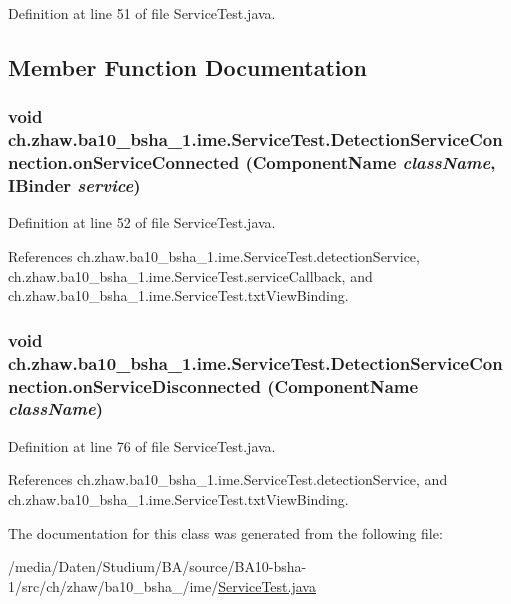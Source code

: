 Definition at line 51 of file ServiceTest.java.

\subsection{Member Function Documentation}
\hypertarget{classch_1_1zhaw_1_1ba10__bsha__1_1_1ime_1_1ServiceTest_1_1DetectionServiceConnection_a52d46455b7ea802c55717fe7b5f51759}{
\subsubsection[{onServiceConnected}]{\setlength{\rightskip}{0pt plus 5cm}void ch.zhaw.ba10\_\-bsha\_\-1.ime.ServiceTest.DetectionServiceConnection.onServiceConnected (ComponentName {\em className}, \/  IBinder {\em service})}}
\label{classch_1_1zhaw_1_1ba10__bsha__1_1_1ime_1_1ServiceTest_1_1DetectionServiceConnection_a52d46455b7ea802c55717fe7b5f51759}


Definition at line 52 of file ServiceTest.java.

References ch.zhaw.ba10\_\-bsha\_\-1.ime.ServiceTest.detectionService, ch.zhaw.ba10\_\-bsha\_\-1.ime.ServiceTest.serviceCallback, and ch.zhaw.ba10\_\-bsha\_\-1.ime.ServiceTest.txtViewBinding.\hypertarget{classch_1_1zhaw_1_1ba10__bsha__1_1_1ime_1_1ServiceTest_1_1DetectionServiceConnection_a308b18246d990cb67a51836ba8ea9f05}{
\subsubsection[{onServiceDisconnected}]{\setlength{\rightskip}{0pt plus 5cm}void ch.zhaw.ba10\_\-bsha\_\-1.ime.ServiceTest.DetectionServiceConnection.onServiceDisconnected (ComponentName {\em className})}}
\label{classch_1_1zhaw_1_1ba10__bsha__1_1_1ime_1_1ServiceTest_1_1DetectionServiceConnection_a308b18246d990cb67a51836ba8ea9f05}


Definition at line 76 of file ServiceTest.java.

References ch.zhaw.ba10\_\-bsha\_\-1.ime.ServiceTest.detectionService, and ch.zhaw.ba10\_\-bsha\_\-1.ime.ServiceTest.txtViewBinding.

The documentation for this class was generated from the following file:\begin{DoxyCompactItemize}
\item 
/media/Daten/Studium/BA/source/BA10-\/bsha-\/1/src/ch/zhaw/ba10\_\-bsha\_/ime/\hyperlink{ServiceTest_8java}{ServiceTest.java}\end{DoxyCompactItemize}
